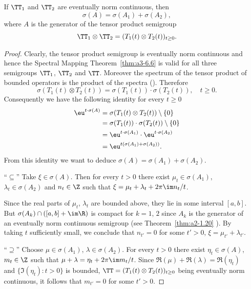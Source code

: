 \begin{corollary}\label{cor:a3-6.8}
If\/ $\TT_{1}$ and $\TT_{2}$ are eventually norm continuous, then
\[
	\sigma(A) = \sigma(A_{1}) + \sigma(A_{2}) ,
\]
where $A$ is the generator of the tensor product semigroup
\[
	\TT_{1} \otimes \TT_{2} = (T_{1}(t) \otimes T_{2}(t))_{t\geq 0} .
\]
\end{corollary}
\begin{proof}
Clearly, the tensor product semigroup is eventually norm continuous and hence the Spectral Mapping Theorem~\ref{thm:a3-6.6} is valid for all three semigroups $\TT_{1}$, $\TT_{2}$ and $\TT$.
Moreover the spectrum of the tensor product of bounded operators is the product of the spectra 
(\textcite[XIII.9]{reedsimon:1978}).
Therefore
\[
	\sigma(T_{1}(t)\otimes T_{2}(t)) = \sigma(T_{1}(t))\cdot\sigma(T_{2}(t)), \quad t \geq 0 .
\]
Consequently we have the following identity for every $t \geq 0$ 
\begin{align*}
\eu^{t\cdot\sigma(A)} &= \sigma(T_{1}(t)\otimes T_{2}(t)) \setminus \{0\} \\
&= \sigma(T_{1}(t))\cdot\sigma(T_{2}(t)) \setminus \{0\} \\
&= \eu^{t\cdot\sigma(A_{1})}\cdot \eu^{t\cdot\sigma(A_{2})} \\
&= \eu^{t(\sigma(A_{1})+\sigma(A_{2}))} .
\end{align*}
From this identity we want to deduce $\sigma(A) = \sigma(A_{1}) + \sigma(A_{2})$.

\enquote{$\subseteq$}\quad 
Take $\xi \in \sigma(A)$.
Then for every $t > 0$ there exist $\mu_{t} \in \sigma(A_{1})$, $\lambda_{t} \in \sigma(A_{2})$ and $n_{t} \in \Z$ such that $\xi = \mu_{t} + \lambda_{t} + 2\pi\im  n_{t}/t$.

Since the real parts of\/ $\mu_{t}$, $\lambda_{t}$ are bounded above, they lie in some interval $[a,b]$.
But $\sigma(A_{k}) \cap ( [a,b] + \im \R )$ is compact for $k = 1$, $2$  since $A_{k}$ is the generator of an eventually norm continuous semigroup (see Theorem~\ref{thm:a2-1.20} ).
By taking $t$ sufficiently small, we conclude that $n_{t'} = 0$ for some $t' > 0$, \ie $\xi = \mu_{t'} + \lambda_{t'}$.

\enquote{$\supseteq$}\quad 
Choose $\mu \in \sigma(A_{1})$, $\lambda \in \sigma(A_{2})$.
For every $t > 0$ there exist $\eta_{t} \in \sigma(A)$, $m_{t} \in \Z$ such that $\mu + \lambda = \eta_{t} + 2\pi \im m_{t}/t$.
Since $\Re(\mu) + \Re(\lambda) = \Re(\eta_{t})$ and $\{\Im(\eta_{t}) \colon t > 0\}$ is bounded, 
$\TT = (T_{1}(t) \otimes T_{2}(t))_{t\geq 0}$ being eventually norm continuous, it follows that $m_{t'} = 0$ for some $t' > 0$.
\end{proof}
